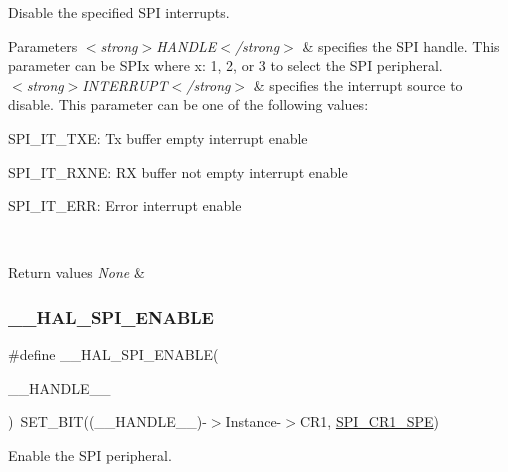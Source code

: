 Disable the specified S\+PI interrupts. 


\begin{DoxyParams}{Parameters}
{\em $<$strong$>$\+H\+A\+N\+D\+L\+E$<$/strong$>$} & specifies the S\+PI handle. This parameter can be S\+P\+Ix where x\+: 1, 2, or 3 to select the S\+PI peripheral. \\
\hline
{\em $<$strong$>$\+I\+N\+T\+E\+R\+R\+U\+P\+T$<$/strong$>$} & specifies the interrupt source to disable. This parameter can be one of the following values\+: \begin{DoxyItemize}
\item S\+P\+I\+\_\+\+I\+T\+\_\+\+T\+XE\+: Tx buffer empty interrupt enable \item S\+P\+I\+\_\+\+I\+T\+\_\+\+R\+X\+NE\+: RX buffer not empty interrupt enable \item S\+P\+I\+\_\+\+I\+T\+\_\+\+E\+RR\+: Error interrupt enable \end{DoxyItemize}
\\
\hline
\end{DoxyParams}

\begin{DoxyRetVals}{Return values}
{\em None} & \\
\hline
\end{DoxyRetVals}
\mbox{\label{group___s_p_i___exported___macros_ga16d2d73c2b16004499ae8d492e71fd4e}} 
\subsubsection{\texorpdfstring{\_\_HAL\_SPI\_ENABLE}{\_\_HAL\_SPI\_ENABLE}}
{\footnotesize\ttfamily \#define \+\_\+\+\_\+\+H\+A\+L\+\_\+\+S\+P\+I\+\_\+\+E\+N\+A\+B\+LE(\begin{DoxyParamCaption}\item[{}]{\+\_\+\+\_\+\+H\+A\+N\+D\+L\+E\+\_\+\+\_\+ }\end{DoxyParamCaption})~S\+E\+T\+\_\+\+B\+IT((\+\_\+\+\_\+\+H\+A\+N\+D\+L\+E\+\_\+\+\_\+)-\/$>$Instance-\/$>$C\+R1, \mbox{\hyperlink{group___peripheral___registers___bits___definition_gac5a646d978d3b98eb7c6a5d95d75c3f9}{S\+P\+I\+\_\+\+C\+R1\+\_\+\+S\+PE}})}



Enable the S\+PI peripheral. 


